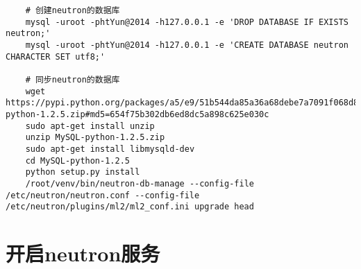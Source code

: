 \documentclass[a4paper,left=1.5cm,right=1.5cm,11pt]{article}
\begin{document}
\begin{lstlisting}
	# 创建neutron的数据库
	mysql -uroot -phtYun@2014 -h127.0.0.1 -e 'DROP DATABASE IF EXISTS neutron;'
	mysql -uroot -phtYun@2014 -h127.0.0.1 -e 'CREATE DATABASE neutron CHARACTER SET utf8;'
	
	# 同步neutron的数据库
	wget https://pypi.python.org/packages/a5/e9/51b544da85a36a68debe7a7091f068d802fc515a3a202652828c73453cad/MySQL-python-1.2.5.zip#md5=654f75b302db6ed8dc5a898c625e030c
	sudo apt-get install unzip
	unzip MySQL-python-1.2.5.zip
	sudo apt-get install libmysqld-dev
	cd MySQL-python-1.2.5
	python setup.py install
	/root/venv/bin/neutron-db-manage --config-file /etc/neutron/neutron.conf --config-file /etc/neutron/plugins/ml2/ml2_conf.ini upgrade head
	\end{lstlisting}

\section{开启neutron服务}
\end{document}
